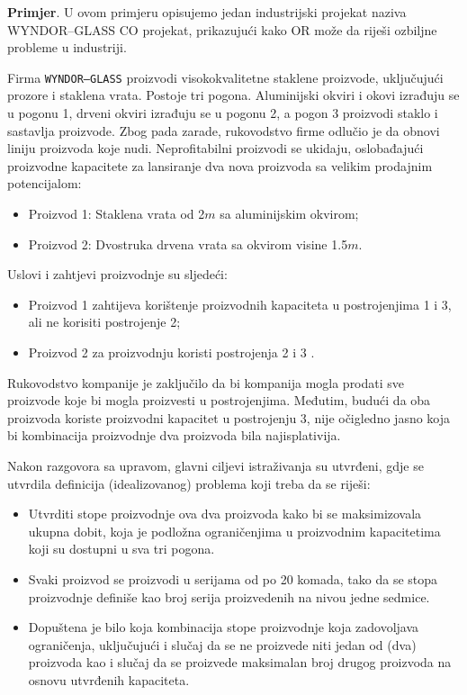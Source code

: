 \documentclass[a4paper, utf8, 11pt, colorlinks]{book}
\begin{document}
\textbf{Primjer}. U ovom primjeru opisujemo jedan industrijski projekat 
naziva {WYNDOR--GLASS CO projekat}, prikazujući kako OR može da riješi ozbiljne probleme u industriji. 
  
Firma \texttt{WYNDOR--GLASS} proizvodi visokokvalitetne staklene proizvode, uključujući prozore i staklena vrata. Postoje tri pogona. Aluminijski okviri i okovi izrađuju se u pogonu 1, drveni okviri izrađuju se u pogonu 2, a pogon 3 proizvodi staklo i sastavlja proizvode.
Zbog pada zarade, rukovodstvo firme   odlučio je da obnovi liniju proizvoda koje nudi. Neprofitabilni proizvodi se ukidaju, oslobađajući proizvodne kapacitete za lansiranje dva nova proizvoda sa velikim prodajnim potencijalom:
\begin{itemize}
    \item Proizvod 1: Staklena vrata od 2$m$ sa aluminijskim okvirom;
    \item Proizvod 2: Dvostruka drvena vrata sa okvirom visine 1.5$m$.
\end{itemize}
Uslovi i zahtjevi proizvodnje su sljedeći:
\begin{itemize}
    \item Proizvod 1 zahtijeva   korištenje proizvodnih kapaciteta u postrojenjima 1 i 3, ali ne korisiti postrojenje 2; 
    \item Proizvod 2 za proizvodnju koristi   postrojenja 2 i 3 . 
\end{itemize}
    Rukovodstvo kompanije je zaključilo da bi kompanija mogla prodati sve proizvode koje bi mogla proizvesti u postrojenjima. Međutim, budući da   oba proizvoda koriste proizvodni kapacitet u postrojenju 3, nije očigledno jasno koja bi kombinacija proizvodnje dva proizvoda bila najisplativija. %

Nakon razgovora sa upravom, glavni ciljevi istraživanja su utvrđeni, gdje se utvrdila definicija  (idealizovanog) problema koji treba da se riješi:
\begin{itemize}
    \item Utvrditi  stope proizvodnje  ova dva proizvoda kako bi se maksimizovala ukupna dobit, koja je podložna ograničenjima u  proizvodnim kapacitetima koji su dostupni u sva tri pogona. 
    \item Svaki proizvod se proizvodi u serijama od po 20 komada, tako da se stopa proizvodnje definiše kao broj serija proizvedenih na nivou jedne sedmice. 
    \item Dopuštena je bilo koja kombinacija stope proizvodnje koja zadovoljava ograničenja, uključujući i slučaj da se ne proizvede niti jedan od (dva) proizvoda kao i slučaj da se proizvede maksimalan broj drugog proizvoda na osnovu utvrđenih kapaciteta.
\end{itemize}
\end{document}
